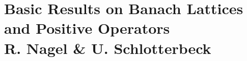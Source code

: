 
\chapter{Basic Results on Banach Lattices and Positive Operators \\ R. Nagel \& U. Schlotterbeck}\label{chap:C-I}
